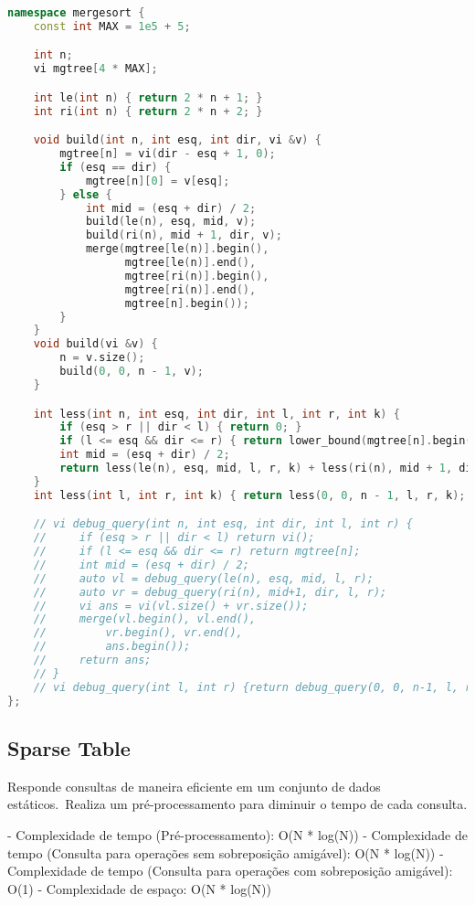 \documentclass[11pt, a4paper, twoside]{article}
\begin{document}
\begin{lstlisting}[language=C++]
namespace mergesort {
    const int MAX = 1e5 + 5;

    int n;
    vi mgtree[4 * MAX];

    int le(int n) { return 2 * n + 1; }
    int ri(int n) { return 2 * n + 2; }

    void build(int n, int esq, int dir, vi &v) {
        mgtree[n] = vi(dir - esq + 1, 0);
        if (esq == dir) {
            mgtree[n][0] = v[esq];
        } else {
            int mid = (esq + dir) / 2;
            build(le(n), esq, mid, v);
            build(ri(n), mid + 1, dir, v);
            merge(mgtree[le(n)].begin(),
                  mgtree[le(n)].end(),
                  mgtree[ri(n)].begin(),
                  mgtree[ri(n)].end(),
                  mgtree[n].begin());
        }
    }
    void build(vi &v) {
        n = v.size();
        build(0, 0, n - 1, v);
    }

    int less(int n, int esq, int dir, int l, int r, int k) {
        if (esq > r || dir < l) { return 0; }
        if (l <= esq && dir <= r) { return lower_bound(mgtree[n].begin(), mgtree[n].end(), k) - mgtree[n].begin(); }
        int mid = (esq + dir) / 2;
        return less(le(n), esq, mid, l, r, k) + less(ri(n), mid + 1, dir, l, r, k);
    }
    int less(int l, int r, int k) { return less(0, 0, n - 1, l, r, k); }

    // vi debug_query(int n, int esq, int dir, int l, int r) {
    //     if (esq > r || dir < l) return vi();
    //     if (l <= esq && dir <= r) return mgtree[n];
    //     int mid = (esq + dir) / 2;
    //     auto vl = debug_query(le(n), esq, mid, l, r);
    //     auto vr = debug_query(ri(n), mid+1, dir, l, r);
    //     vi ans = vi(vl.size() + vr.size());
    //     merge(vl.begin(), vl.end(),
    //         vr.begin(), vr.end(),
    //         ans.begin());
    //     return ans;
    // }
    // vi debug_query(int l, int r) {return debug_query(0, 0, n-1, l, r);}
};
\end{lstlisting}

\subsection{Sparse Table}



Responde consultas de maneira eficiente em um conjunto de dados estáticos.\
Realiza um pré-processamento para diminuir o tempo de cada consulta.

- Complexidade de tempo (Pré-processamento): O(N * log(N))
- Complexidade de tempo (Consulta para operações sem sobreposição amigável): O(N * log(N))
- Complexidade de tempo (Consulta para operações com sobreposição amigável): O(1)
- Complexidade de espaço: O(N * log(N))
\end{document}
